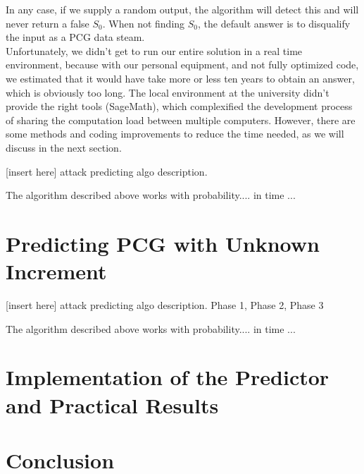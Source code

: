 \documentclass[preprint]{iacrtrans}
\begin{document}
In any case, if we supply a random output, the algorithm will detect this and will never return a false $S_0$. When not finding $S_0$, the default answer is to disqualify the input as a PCG data steam.\\

Unfortunately, we didn't get to run our entire solution in a real time environment, because with our personal equipment, and not fully optimized code, we estimated that it would have take more or less ten years to obtain an answer, which is obviously too long.
The local environment at the university didn't provide the right tools (SageMath), which complexified the development process of sharing the computation load between multiple computers. However, there are some methods and coding improvements to reduce the time needed, as we will discuss in the next section.

[insert here] attack predicting algo description.

\begin{theorem}
  The algorithm described above works with probability.... in time ...
\end{theorem}

\section{Predicting PCG with Unknown Increment}

[insert here] attack predicting algo description. Phase 1, Phase 2, Phase 3

\begin{theorem}
  The algorithm described above works with probability.... in time ...
\end{theorem}

\section{Implementation of the Predictor and Practical Results}

\section{Conclusion}




\end{document}
